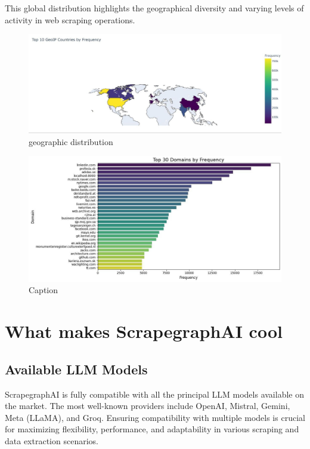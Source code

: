 This global distribution highlights the geographical diversity and varying levels of activity in web scraping operations.

\begin{figure}[h!]
    \centering
    \includegraphics[scale=0.25]{Assets/countries.jpg}
    \caption{geographic distribution}
    \label{fig:geographic-distribution}
\end{figure}

\begin{figure}[h!]
    \centering
    \includegraphics[scale=0.45]{Assets/websites.jpg}
    \caption{Caption}
    \label{fig:enter-label}
\end{figure}
\section{What makes ScrapegraphAI  cool}
\subsection{Available LLM Models}

ScrapegraphAI is fully compatible with all the principal LLM models available on the market. The most well-known providers include OpenAI, Mistral, Gemini, Meta (LLaMA), and Groq. Ensuring compatibility with multiple models is crucial for maximizing flexibility, performance, and adaptability in various scraping and data extraction scenarios.

